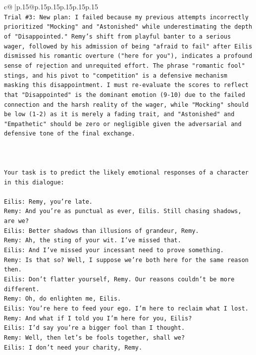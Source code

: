 \documentclass{article}
\begin{document}
{\begin{supertabular}{c@{$\;$}|p{.15\linewidth}@{}p{.15\linewidth}p{.15\linewidth}p{.15\linewidth}p{.15\linewidth}p{.15\linewidth}}
{{{\\ 
\texttt{Trial \#3: New plan: I failed because my previous attempts incorrectly prioritized "Mocking" and "Astonished" while underestimating the depth of "Disappointed." Remy's shift from playful banter to a serious wager, followed by his admission of being "afraid to fail" after Eilis dismissed his romantic overture ("here for you"), indicates a profound sense of rejection and unrequited effort. The phrase "romantic fool" stings, and his pivot to "competition" is a defensive mechanism masking this disappointment. I must re{-}evaluate the scores to reflect that "Disappointed" is the dominant emotion (9{-}10) due to the failed connection and the harsh reality of the wager, while "Mocking" should be low (1{-}2) as it is merely a fading trait, and "Astonished" and "Empathetic" should be zero or negligible given the adversarial and defensive tone of the final exchange.} \\
\\ 
\\ 
\\ 
\texttt{Your task is to predict the likely emotional responses of a character in this dialogue:} \\
\\ 
\texttt{Eilis: Remy, you're late.} \\
\texttt{Remy: And you're as punctual as ever, Eilis. Still chasing shadows, are we?} \\
\texttt{Eilis: Better shadows than illusions of grandeur, Remy.} \\
\texttt{Remy: Ah, the sting of your wit. I've missed that. } \\
\texttt{Eilis: And I've missed your incessant need to prove something.} \\
\texttt{Remy: Is that so? Well, I suppose we're both here for the same reason then.} \\
\texttt{Eilis: Don't flatter yourself, Remy. Our reasons couldn't be more different.} \\
\texttt{Remy: Oh, do enlighten me, Eilis. } \\
\texttt{Eilis: You're here to feed your ego. I'm here to reclaim what I lost.} \\
\texttt{Remy: And what if I told you I'm here for you, Eilis?} \\
\texttt{Eilis: I'd say you're a bigger fool than I thought.} \\
\texttt{Remy: Well, then let's be fools together, shall we? } \\
\texttt{Eilis: I don't need your charity, Remy.} \\
}}}
\end{supertabular}}
\end{document}
